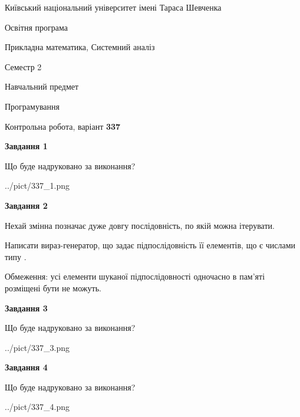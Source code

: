 \documentclass[12pt, ukrainian]{article}
\begin{document}
{{\begin {small}\par
{ \center  Київський національний університет імені Тараса Шевченка \par}
{\parbox {5 cm}{Освітня програма \hfill}{\parbox {8 cm}{Прикладна математика, Системний аналіз \hfill}}\parbox {5 cm}{\hfill Семестр 2}}\par
{\parbox {5 cm} {Навчальний предмет \hfill}\parbox {7 cm}{Програмування \hfill}\parbox {6cm}{\hfill}\par}\vspace{-7pt} \end{small}}{\center Контрольна робота, варіант  \No \textbf
{ 337 }\par}}
{
\begin {large}
{\begin {center}\textbf{Завдання 1}\end {center}}\par
Що буде надруковано за виконання?\par\par
\begin{center}
	{../pict/337_1.png}
\end{center}
\newpage

{\begin {center}\textbf{Завдання 2}\end {center}}\par
Нехай змінна  позначає дуже довгу послідовність, по якій можна ітерувати.

Написати вираз-генератор, що задає підпослідовність її елементів, що є числами типу .

Обмеження: усі елементи шуканої підпослідовності одночасно в пам'яті розміщені бути не можуть.\par
\newpage

{\begin {center}\textbf{Завдання 3}\end {center}}\par
Що буде надруковано за виконання?\par
\begin{center}
	{../pict/337_3.png}
\end{center}
\newpage

{\begin {center}\textbf{Завдання 4}\end {center}}\par
Що буде надруковано за виконання?\par
\begin{center}
	{../pict/337_4.png}
\end{center}
\newpage


\end{large}}
\end{document}
